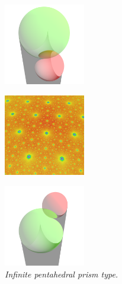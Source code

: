 \begin{figure}[h!tbp]
 \begin{minipage}[t]{0.5\textwidth}
  \begin{minipage}[t]{0.24\textwidth}
   \centering
   \includegraphics[width=1.4in, height=1.4in, keepaspectratio]{./img/application/sphairahedron/variations/pentahedralPrism/nflatPrism.png}
   \label{fig:semi-prism-under}
  \end{minipage}
  \hspace*{\fill}
  \begin{minipage}[t]{0.24\textwidth}
   \centering
   \includegraphics[width=1.4in, height=1.4in, keepaspectratio]{./img/application/sphairahedron/variations/pentahedralPrism/flat.jpg}
   \label{fig:semi-prism-under-limit}
  \end{minipage}
  \hspace*{\fill}
  \caption{\textit{Infinite pentahedral prism type.}}
  \label{fig:semi-sphaira-under}
 \end{minipage}
 \begin{minipage}[t]{0.5\textwidth}
  \begin{minipage}[t]{0.24\textwidth}
   \centering
   \includegraphics[width=1.4in, height=1.4in, keepaspectratio]{./img/application/sphairahedron/variations/pentahedralPrism/nglowPrism.png}

\end{minipage}
\end{minipage}
\end{figure}
